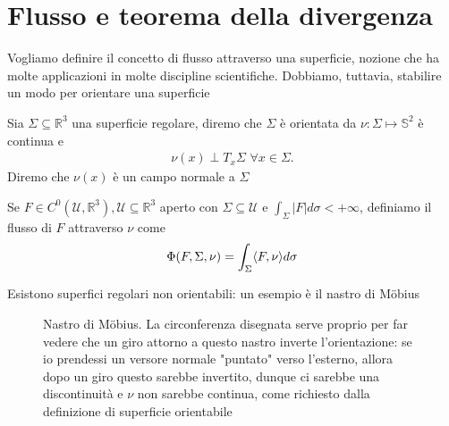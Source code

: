 \section{Flusso e teorema della divergenza}
%
Vogliamo definire il concetto di flusso attraverso una superficie, nozione che ha molte applicazioni in molte discipline scientifiche. Dobbiamo, tuttavia, stabilire un modo per orientare una superficie 
%
\vspace{0.5cm}
\begin{definition}[\textcolor{blue}{superficie regolare orientata da $\nu$}]
	Sia $\Sigma \subseteq \mathbb{R}^3$ una superficie regolare, diremo che $\Sigma$ è orientata da $\nu: \Sigma \mapsto \mathbb{S}^2$ è continua e 
	\[\begin{aligned}
	\nu(x) \perp T_{x} \Sigma \, \, \forall x \in \Sigma.
	\end{aligned}\]
	Diremo che $\nu(x)$ è un campo normale a $\Sigma$
\end{definition}
%
\vspace{0.5cm}
\begin{definition}
	Se $F \in C^0(\mathcal{U}, \mathbb{R}^3), \mathcal{U} \subseteq \mathbb{R}^3$ aperto con $\Sigma \subseteq \mathcal{U}$ e $\int_\Sigma |F|d\sigma < +\infty$, definiamo il flusso di $F$ attraverso $\nu$ come
	$$
	\Phi(F, \Sigma, \nu) = \int_\Sigma \langle F, \nu \rangle d\sigma
	$$
\end{definition}
%
\vspace{0.5cm}
\begin{remark}
	Esistono superfici regolari non orientabili: un esempio è il nastro di Möbius
	\begin{figure}[H]
		\centering
		  \caption{Nastro di Möbius. La circonferenza disegnata serve proprio per far vedere che un giro attorno a questo nastro inverte l'orientazione: se io prendessi un versore normale "puntato" verso l'esterno, allora dopo un giro questo sarebbe invertito, dunque ci sarebbe una discontinuità e $\nu$ non sarebbe continua,
		  come richiesto dalla definizione di superficie orientabile}
	\end{figure}
\end{remark}
